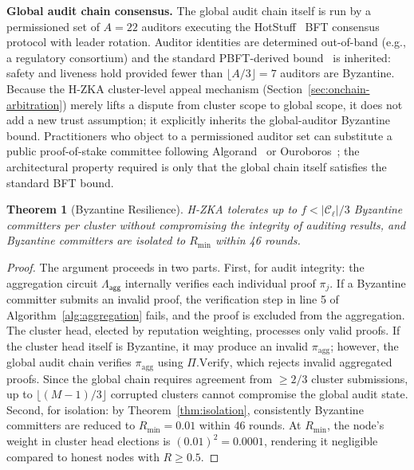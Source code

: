 \documentclass[journal]{IEEEtran}
\newtheorem{theorem}{Theorem}
\newcommand{\aggCircuit}{\Lambda_{\mathsf{agg}}}
\begin{document}
\textbf{Global audit chain consensus.} The global audit chain itself is run by a permissioned set of $A = 22$ auditors executing the HotStuff~\cite{yin2019hotstuff} BFT consensus protocol with leader rotation. Auditor identities are determined out-of-band (e.g., a regulatory consortium) and the standard PBFT-derived bound~\cite{castro1999pbft, lamport1982byzantine} is inherited: safety and liveness hold provided fewer than $\lfloor A/3 \rfloor = 7$ auditors are Byzantine. Because the H-ZKA cluster-level appeal mechanism (Section~\ref{sec:onchain-arbitration}) merely lifts a dispute from cluster scope to global scope, it does not add a new trust assumption; it explicitly inherits the global-auditor Byzantine bound. Practitioners who object to a permissioned auditor set can substitute a public proof-of-stake committee following Algorand~\cite{chen2017algorand} or Ouroboros~\cite{kiayias2017ouroboros}; the architectural property required is only that the global chain itself satisfies the standard BFT bound.

\begin{theorem}[Byzantine Resilience]
\label{thm:byzantine}
H-ZKA tolerates up to $f < |\mathcal{C}_\ell|/3$ Byzantine committers per cluster without compromising the integrity of auditing results, and Byzantine committers are isolated to $R_{\min}$ within 46 rounds.
\end{theorem}

\begin{proof}
The argument proceeds in two parts. First, for audit integrity: the aggregation circuit $\aggCircuit$ internally verifies each individual proof $\pi_j$. If a Byzantine committer submits an invalid proof, the verification step in line 5 of Algorithm~\ref{alg:aggregation} fails, and the proof is excluded from the aggregation. The cluster head, elected by reputation weighting, processes only valid proofs. If the cluster head itself is Byzantine, it may produce an invalid $\pi_{\text{agg}}$; however, the global audit chain verifies $\pi_{\text{agg}}$ using $\Pi.\text{Verify}$, which rejects invalid aggregated proofs. Since the global chain requires agreement from $\geq 2/3$ cluster submissions, up to $\lfloor(M-1)/3\rfloor$ corrupted clusters cannot compromise the global audit state. Second, for isolation: by Theorem~\ref{thm:isolation}, consistently Byzantine committers are reduced to $R_{\min} = 0.01$ within 46 rounds. At $R_{\min}$, the node's weight in cluster head elections is $(0.01)^2 = 0.0001$, rendering it negligible compared to honest nodes with $R \geq 0.5$.
\end{proof}
\end{document}
